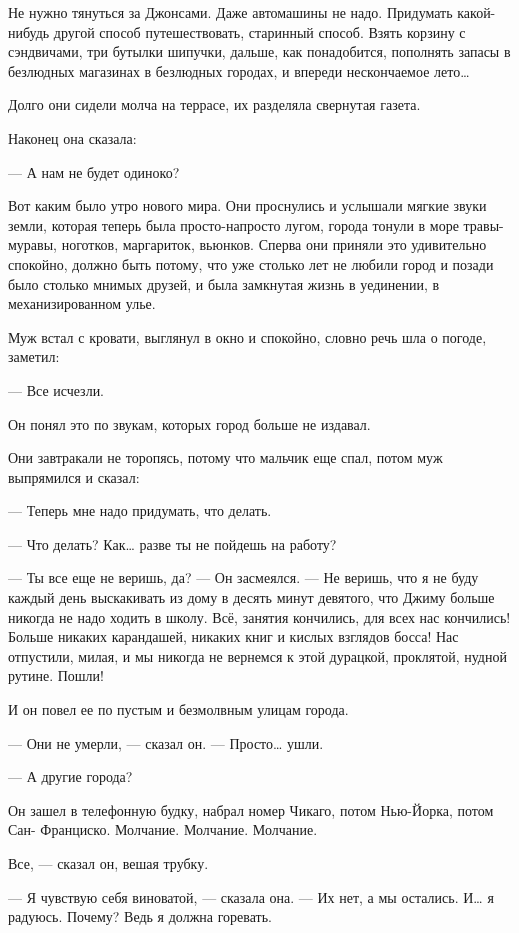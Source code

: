 Не нужно тянуться за Джонсами. Даже автомашины не надо. Придумать какой-нибудь
другой способ путешествовать, старинный способ. Взять корзину с сэндвичами, три
бутылки шипучки, дальше, как понадобится, пополнять запасы в безлюдных
магазинах в безлюдных городах, и впереди нескончаемое лето…

Долго они сидели молча на террасе, их разделяла свернутая газета.

Наконец она сказала:

— А нам не будет одиноко?

Вот каким было утро нового мира. Они проснулись и услышали мягкие звуки земли,
которая теперь была просто-напросто лугом, города тонули в море травы-муравы,
ноготков, маргариток, вьюнков. Сперва они приняли это удивительно спокойно,
должно быть потому, что уже столько лет не любили город и позади было столько
мнимых друзей, и была замкнутая жизнь в уединении, в механизированном улье.

Муж встал с кровати, выглянул в окно и спокойно, словно речь шла о погоде,
заметил:

— Все исчезли.

Он понял это по звукам, которых город больше не издавал.

Они завтракали не торопясь, потому что мальчик еще спал, потом муж выпрямился и
сказал:

— Теперь мне надо придумать, что делать.

— Что делать? Как… разве ты не пойдешь на работу?

— Ты все еще не веришь, да? — Он засмеялся. — Не веришь, что я не буду каждый
день выскакивать из дому в десять минут девятого, что Джиму больше никогда не
надо ходить в школу. Всё, занятия кончились, для всех нас кончились! Больше
никаких карандашей, никаких книг и кислых взглядов босса! Нас отпустили, милая,
и мы никогда не вернемся к этой дурацкой, проклятой, нудной рутине. Пошли!

И он повел ее по пустым и безмолвным улицам города.

— Они не умерли, — сказал он. — Просто… ушли.

— А другие города?

Он зашел в телефонную будку, набрал номер Чикаго, потом Нью-Йорка, потом Сан-
Франциско. Молчание. Молчание. Молчание.

Все, — сказал он, вешая трубку.

— Я чувствую себя виноватой, — сказала она. — Их нет, а мы остались. И… я
радуюсь. Почему? Ведь я должна горевать.

